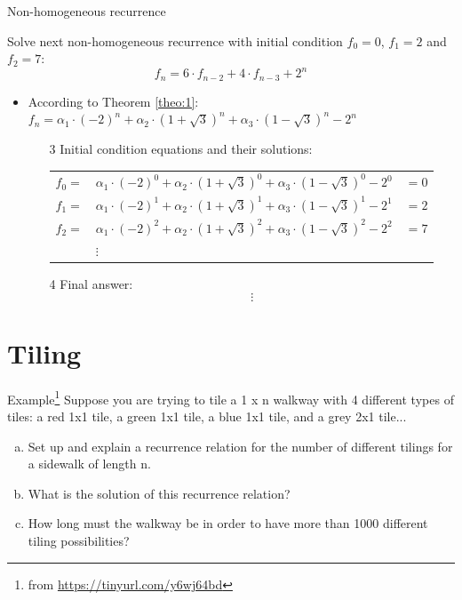 \documentclass{beamer}
\begin{document}
\begin{frame}{Non-homogeneous recurrence}

    {\small Solve next non-homogeneous recurrence with initial condition $f_0=0$, $f_1=2$ and $f_2=7$:
    \begin{equation}\tag{1}
        f_n = 6 \cdot f_{n-2} + 4 \cdot f_{n-3} + 2^n
    \end{equation} }
    \begin{itemize}
        \item According to Theorem \ref{theo:1}: 
            $ f_n = \alpha_1 \cdot (-2)^n + \alpha_2 \cdot (1+\sqrt{3})^n + \alpha_3 \cdot (1-\sqrt{3})^n - 2^n $
        \begin{enumerate}    
            \item[3] Initial condition equations and their solutions:
                \begin{tabular}{l l l}
                    $f_0 = $ & $\alpha_1 \cdot (-2)^0 + \alpha_2 \cdot (1+\sqrt{3})^0 + \alpha_3 \cdot (1-\sqrt{3})^0 - 2^0$ & $= 0$ \\ 
                    $f_1 = $ & $\alpha_1 \cdot (-2)^1 + \alpha_2 \cdot (1+\sqrt{3})^1 + \alpha_3 \cdot (1-\sqrt{3})^1 - 2^1$ & $= 2$ \\ 
                    $f_2 = $ & $\alpha_1 \cdot (-2)^2 + \alpha_2 \cdot (1+\sqrt{3})^2 + \alpha_3 \cdot (1-\sqrt{3})^2 - 2^2$ & $= 7$ \\
                             & $\vdots$                                                                                      &
                \end{tabular}
            \item[4] Final answer:
                $$ \vdots $$
        \end{enumerate}
    \end{itemize}
\end{frame}

\section{Tiling}

\begin{frame}{Example\footnote{from \url{https://tinyurl.com/y6wj64bd}}}
    Suppose you are trying to tile a 1 x n walkway with 4 different types of tiles: a red 1x1 tile, a green 1x1 tile, a blue 1x1 tile, and a grey 2x1 tile...
    \begin{enumerate}[a)]
        \item Set up and explain a recurrence relation for the number of different tilings for a sidewalk of length n.
        \item What is the solution of this recurrence relation?
        \item How long must the walkway be in order to have more than 1000 different tiling possibilities? 
    \end{enumerate}
\end{frame}
\end{document}
